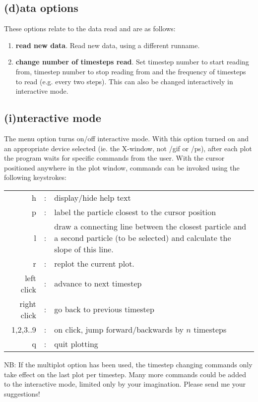 \documentclass[a4paper,12pt]{article}
\begin{document}
\subsection{(d)ata options}
These options relate to the data read and are as follows:
\begin{enumerate}
\item \textbf{read new data}. Read new data, using a different runname.
\item \textbf{change number of timesteps read}. Set timestep number to start
reading from, timestep number to stop reading from and the frequency of
timesteps to read (e.g. every two steps). This can also be changed interactively in
interactive mode.
\end{enumerate}

\subsection{(i)nteractive mode}
 The menu option turns on/off interactive mode. With this option turned on and
an appropriate device selected (ie. the X-window, not /gif or /ps), after
each plot the program waits for specific commands from the user. With the cursor
positioned anywhere in the plot window, commands can be invoked using the
following keystrokes:

\begin{tabular}{rcp{}}
 h & : & display/hide help text \\
 p & : & label the particle closest to the cursor position \\
 l & : & draw a connecting line between the closest particle and a second
 particle (to be selected) and calculate the slope of this line. \\
 r & : & replot the current plot. \\
 left click & : & advance to next timestep \\
 right click & : & go back to previous timestep \\
  1,2,3..9 & : & on click, jump forward/backwards by $n$ timesteps \\
  q & : & quit plotting 
\end{tabular}

 NB: If the multiplot option has been used, the timestep changing commands only
take effect on the last plot per timestep. Many more commands could be added to
the interactive mode, limited only by your imagination. Please send me your suggestions!
\end{document}
